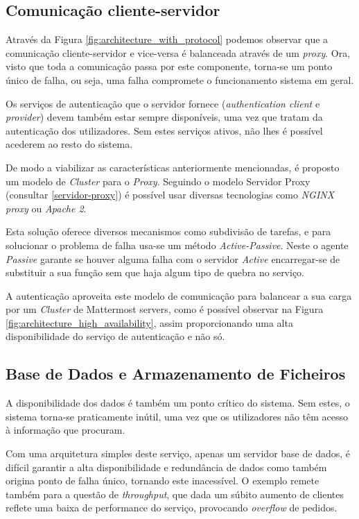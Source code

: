 \subsection{Comunicação cliente-servidor}

Através da Figura \ref{fig:architecture_with_protocol} podemos observar que a comunicação cliente-servidor e vice-versa é balanceada através de um \textit{proxy}. Ora, visto que toda a comunicação passa por este componente, torna-se um ponto único de falha, ou seja, uma falha compromete o funcionamento sistema em geral.\par
Os serviços de autenticação que o servidor fornece (\textit{authentication client} e \textit{provider}) devem também estar sempre disponíveis, uma vez que tratam da autenticação dos utilizadores. Sem estes serviços ativos, não lhes é possível acederem ao resto do sistema.

De modo a viabilizar as características anteriormente mencionadas, é proposto um modelo de \textit{Cluster} para o \textit{Proxy}.
Seguindo o modelo Servidor Proxy (consultar \ref{servidor-proxy}) é possível usar diversas tecnologias como \textit{NGINX proxy} ou \textit{Apache 2}.

Esta solução oferece diversos mecanismos como subdivisão de tarefas, e para solucionar o problema de falha usa-se um método \textit{Active-Passive}.
Neste o agente \textit{Passive} garante se houver alguma falha com o servidor \textit{Active} encarregar-se de substituir a sua função sem que haja algum tipo de quebra no serviço.

A autenticação aproveita este modelo de comunicação para balancear a sua carga por um \textit{Cluster} de Mattermost servers, como é possível observar na Figura \ref{fig:architecture_high_availability}, assim proporcionando uma alta disponibilidade do serviço de autenticação e não só.


\subsection{Base de Dados e Armazenamento de Ficheiros}

A disponibilidade dos dados é também um ponto crítico do sistema. Sem estes, o sistema torna-se praticamente inútil, uma vez que os utilizadores não têm acesso à informação que procuram.

Com uma arquitetura simples deste serviço, apenas um servidor base de dados, é difícil garantir a alta disponibilidade e redundância de dados como também origina ponto de falha único, tornando este inacessível.
O exemplo remete também para a questão de \textit{throughput}, que dada um súbito aumento de clientes reflete uma baixa de performance do serviço, provocando \textit{overflow} de pedidos.

